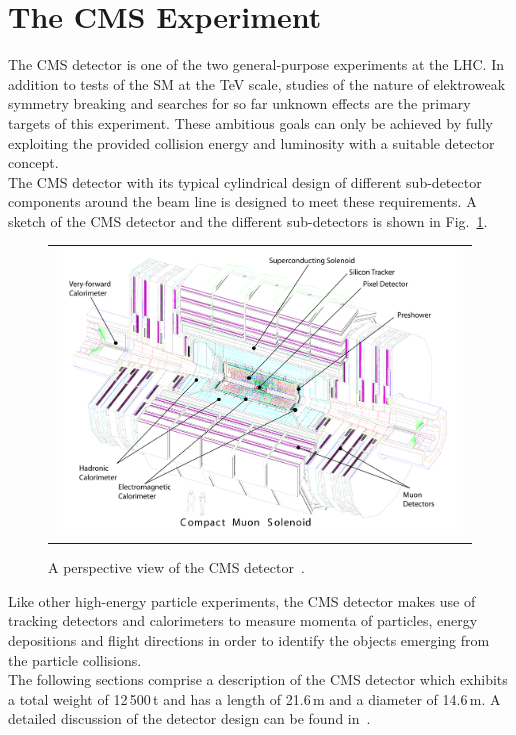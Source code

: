 \section{The CMS Experiment}
\label{sec:cms}
The CMS detector is one of the two general-purpose experiments at the LHC. In addition to tests of the SM at the TeV scale, studies of the nature of elektroweak symmetry breaking and searches for so far unknown effects are the primary targets of this experiment. These ambitious goals can only be achieved by fully exploiting the provided collision energy and luminosity with a suitable detector concept.\\
The CMS detector with its typical cylindrical design of different sub-detector components around the beam line is designed to meet these requirements. A sketch of the CMS detector and the different sub-detectors is shown in Fig.~\ref{fig:CMS}.
\begin{figure}[!t]
  \centering
  \begin{tabular}{c}
    \includegraphics[width=0.99\textwidth]{figures/cms_complete_labelled.pdf}
  \end{tabular}
  \caption{A perspective view of the CMS detector~\cite{Chatrchyan:2008zzk}.}
  \label{fig:CMS}
\end{figure}
Like other high-energy particle experiments, the CMS detector makes use of tracking detectors and calorimeters to measure momenta of particles, energy depositions and flight directions in order to identify the objects emerging from the particle collisions. \\
The following sections comprise a description of the CMS detector which exhibits a total weight of 12\,500\,t and has a length of 21.6\,m and a diameter of 14.6\,m. A detailed discussion of the detector design can be found in~\cite{Chatrchyan:2008zzk, bib:cmsptdr1}. %

